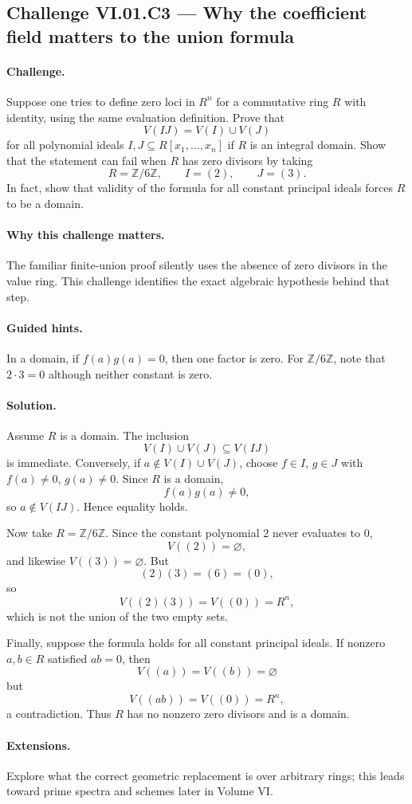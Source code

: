 \subsection*{Challenge VI.01.C3 --- Why the coefficient field matters to the union formula}
\label{chal:vi01-c3}

\paragraph{Challenge.}
Suppose one tries to define zero loci in \(R^n\) for a commutative ring \(R\) with
identity, using the same evaluation definition.  Prove that
\[
V(IJ)=V(I)\cup V(J)
\]
for all polynomial ideals \(I,J\subseteq R[x_1,\dots,x_n]\) if \(R\) is an integral
domain.  Show that the statement can fail when \(R\) has zero divisors by taking
\[
R=\mathbb Z/6\mathbb Z,
\qquad I=(2),
\qquad J=(3).
\]
In fact, show that validity of the formula for all constant principal ideals forces \(R\)
to be a domain.

\ifdefined\FullProblemDossiers
\paragraph{Why this challenge matters.}
The familiar finite-union proof silently uses the absence of zero divisors in the value
ring.  This challenge identifies the exact algebraic hypothesis behind that step.

\paragraph{Guided hints.}
In a domain, if \(f(a)g(a)=0\), then one factor is zero.  For \(\mathbb Z/6\mathbb Z\), note
that \(2\cdot3=0\) although neither constant is zero.

\paragraph{Solution.}
Assume \(R\) is a domain.  The inclusion
\[
V(I)\cup V(J)\subseteq V(IJ)
\]
is immediate.  Conversely, if \(a\notin V(I)\cup V(J)\), choose \(f\in I\), \(g\in J\)
with \(f(a)\neq0\), \(g(a)\neq0\).  Since \(R\) is a domain,
\[
f(a)g(a)\neq0,
\]
so \(a\notin V(IJ)\).  Hence equality holds.

Now take \(R=\mathbb Z/6\mathbb Z\).  Since the constant polynomial \(2\) never evaluates
to \(0\),
\[
V((2))=\varnothing,
\]
and likewise \(V((3))=\varnothing\).  But
\[
(2)(3)=(6)=(0),
\]
so
\[
V((2)(3))=V((0))=R^n,
\]
which is not the union of the two empty sets.

Finally, suppose the formula holds for all constant principal ideals.  If nonzero
\(a,b\in R\) satisfied \(ab=0\), then
\[
V((a))=V((b))=\varnothing
\]
but
\[
V((ab))=V((0))=R^n,
\]
a contradiction.  Thus \(R\) has no nonzero zero divisors and is a domain.

\paragraph{Extensions.}
Explore what the correct geometric replacement is over arbitrary rings; this leads toward
prime spectra and schemes later in Volume VI.
\fi
